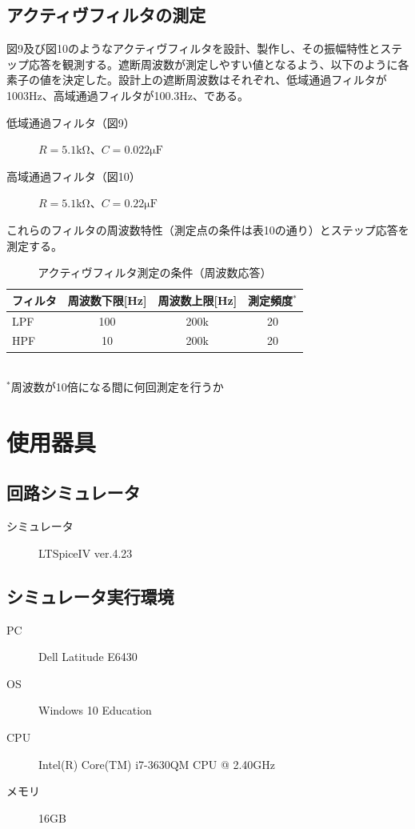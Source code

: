 \documentclass[10pt,a4j,dvipdfmx]{jsarticle}
\makeatletter
\let\@oldsec\section
\let\@oldsubsec\subsection
\renewcommand{\section}[1]{\@oldsec{#1}\vspace{-5pt}{\color{TealBlue}\hrule height 0.6pt \hfill}\par}
\renewcommand{\subsection}[1]{\vspace{-7pt}\@oldsubsec{#1}}
\makeatother
\begin{document}
\subsection{アクティヴフィルタの測定}
図9及び図10のようなアクティヴフィルタを設計、製作し、その振幅特性とステップ応答を観測する。遮断周波数が測定しやすい値となるよう、以下のように各素子の値を決定した。設計上の遮断周波数はそれぞれ、低域通過フィルタが1003\si{\hertz}、高域通過フィルタが100.3\si{\hertz}、である。
\begin{description}
\item[低域通過フィルタ（図9）] $R=5.1\si{\kilo\ohm}$、$C=0.022\si{\micro\farad}$
\item[高域通過フィルタ（図10）] $R=5.1\si{\kilo\ohm}$、$C=0.22\si{\micro\farad}$
\end{description}
これらのフィルタの周波数特性（測定点の条件は表10の通り）とステップ応答を測定する。
\begin{table}[H]
  \begin{center}
    \caption{アクティヴフィルタ測定の条件（周波数応答）}
    \begin{tabular}{|l||c|c|c|} \hline
      フィルタ & 周波数下限[\si{\hertz}] & 周波数上限[\si{\hertz}] & 測定頻度$^*$\\ \hline \hline
      LPF & 100 & 200k & 20 \\
      HPF & 10 & 200k & 20 \\  
      \hline
    \end{tabular}
    \\ $^*$周波数が10倍になる間に何回測定を行うか
  \end{center}
\end{table}


\section{使用器具}

\subsection{回路シミュレータ}
\begin{description}
\item[シミュレータ] LTSpiceI\hspace{-.1em}V ver.4.23
\end{description}

\subsection{シミュレータ実行環境}
\begin{description}
\item[PC] Dell Latitude E6430
\item[OS] Windows 10 Education
\item[CPU] Intel(R) Core(TM) i7-3630QM CPU @ 2.40GHz
\item[メモリ] 16GB
\end{description}
\end{document}
